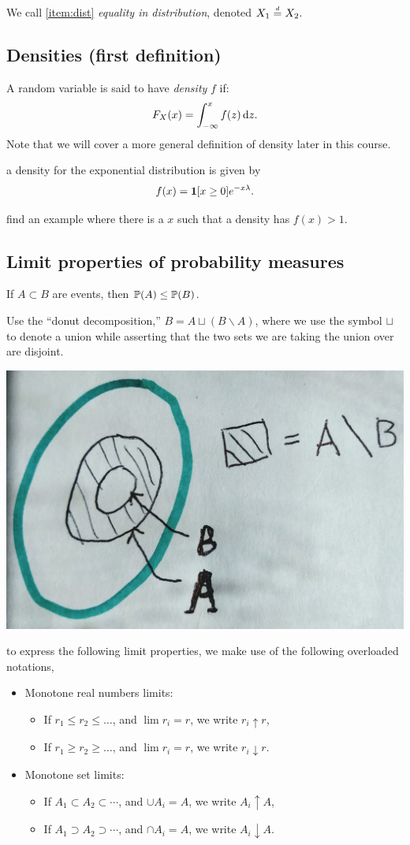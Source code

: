 \documentclass{article}
\begin{document}
 We call \ref{item:dist} \emph{equality in distribution}, denoted $X_1 \deq X_2$. 


\subsection{Densities (first definition)}\label{sec:density-first-def}

A random variable is said to have \emph{density} $f$ if: \[ F_X(x) = \int_{-\infty}^x f(z) \ud z. \] Note that we will cover a more general definition of density later in this course.

 a density for the exponential distribution is given by \[ f(x) = \1[x \ge 0] e^{-x\lambda}. \]

 find an example where there is a $x$ such that a density has $f(x) > 1$.


\subsection{Limit properties of probability measures}\label{sec:limit-pr-measures}

 If $A \subset B$ are events, then $\P(A) \le \P(B)$.

 Use the ``donut decomposition,'' $B = A \sqcup (B \backslash A)$, where we use the symbol $\sqcup$ to denote a union while asserting that the two sets we are taking the union over are disjoint.
\begin{center}
	\includegraphics[width=0.3\linewidth]{figures/donut-1}
\end{center}

 to express the following limit properties, we make use of the following overloaded notations,
\begin{itemize}
  \item Monotone real numbers limits:
  \begin{itemize}
    \item If $r_1 \le r_2 \le \dots$, and $\lim r_i = r$, we write $r_i \uparrow r$,
    \item If $r_1 \ge r_2 \ge \dots$, and $\lim r_i = r$, we write $r_i \downarrow r$.
  \end{itemize}
  \item Monotone set limits:
  \begin{itemize}
    \item If $A_1 \subset A_2 \subset \cdots$, and $\cup A_i = A$, we write $A_i \uparrow A$,
    \item If $A_1 \supset A_2 \supset \cdots$, and $\cap A_i = A$, we write $A_i \downarrow A$.
  \end{itemize}
\end{itemize}
\end{document}
